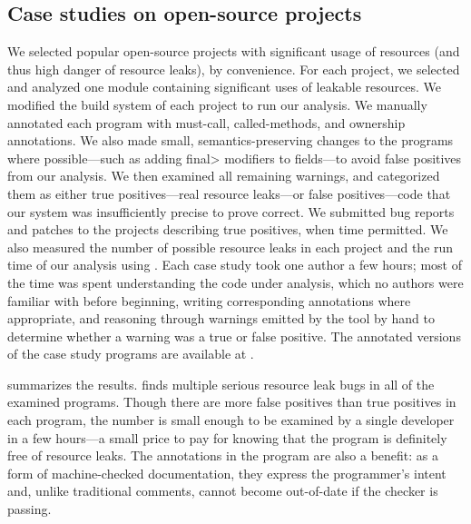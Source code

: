 \subsection{Case studies on open-source projects}
\label{sec:case-studies}

We selected  popular open-source projects with significant
usage of resources (and thus high danger of resource leaks), by
convenience.
For each project, we selected and analyzed one module
containing significant uses of leakable resources.
We modified the build system of each project to run our
analysis. We manually annotated each program with must-call,
called-methods, and ownership annotations. We also
made small, semantics-preserving changes to the programs where
possible---such as adding
\<final> modifiers to fields---to avoid
false positives from our analysis. We then examined all
remaining warnings, and categorized them as either true
positives---real resource leaks---or false positives---code that our
system was insufficiently precise to prove correct. We submitted bug
reports and patches to the projects describing true positives, when time permitted.
We also measured the number of possible resource leaks in each project
and the run time of our analysis using . Each case study took one author a few hours;
most of the time was spent understanding the code under analysis, which no
authors were familiar with before beginning, writing corresponding annotations
where appropriate, and reasoning through warnings emitted by the tool by hand
to determine whether a warning was a true or false positive.
The annotated versions of the case study programs are available at
.

 summarizes the results. \tool finds multiple
serious resource leak bugs in all of the examined programs. Though
there are more false positives than true positives in each program,
the number is small enough to be examined by a single developer in a
few hours---a small price to pay for knowing that the program is
definitely free of resource leaks.  The annotations in the program are
also a benefit: as a form of machine-checked documentation, they
express the programmer's intent and, unlike traditional comments,
cannot become out-of-date if the checker is passing.




